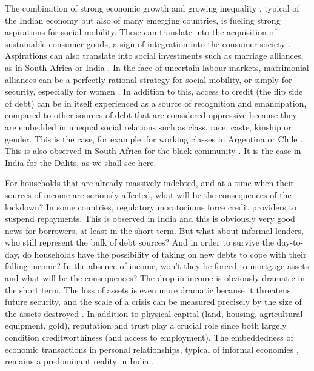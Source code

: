 \documentclass[a4paper, 11pt, onecolumn]{article}
\begin{document}
The combination of strong economic growth and growing inequality \citep{Chancel2019}, typical of the Indian economy but also of many emerging countries, is fueling strong aspirations for social mobility. These can translate into the acquisition of sustainable consumer goods, a sign of integration into the consumer society \citep{Saiag2020, Gonzalez2015}. Aspirations can also translate into social investments such as marriage alliances, as in South Africa or India \citep{James2015, Srinivasan2005}. In the face of uncertain labour markets, matrimonial alliances can be a perfectly rational strategy for social mobility, or simply for security, especially for women \citep{DeNeve2016}. In addition to this, access to credit (the flip side of debt) can be in itself experienced as a source of recognition and emancipation, compared to other sources of debt that are considered oppressive because they are embedded in unequal social relations such as class, race, caste, kinship or gender. This is the case, for example, for working classes in Argentina \citep{Saiag2020} or Chile \citep{Gonzalez2015}. 
This is also observed in South Africa for the black community \citep{James2015}. It is the case in India for the Dalits, as we shall see here.

For households that are already massively indebted, and at a time when their sources of income are seriously affected, what will be the consequences of the lockdown? In some countries, regulatory moratoriums force credit providers to suspend repayments. This is observed in India and this is obviously very good news for borrowers, at least in the short term. But what about informal lenders, who still represent the bulk of debt sources? And in order to survive the day-to-day, do households have the possibility of taking on new debts to cope with their falling income? In the absence of income, won't they be forced to mortgage assets and what will be the consequences? The drop in income is obviously dramatic in the short term. The loss of assets is even more dramatic because it threatens future security, and the scale of a crisis can be measured precisely by the size of the assets destroyed \citep{Rhyne2020}. In addition to physical capital (land, housing, agricultural equipment, gold), reputation and trust play a crucial role since both largely condition creditworthiness (and access to employment). The embeddedness of economic transactions in personal relationships, typical of informal economies \citep{Platteau1994, Hart2000}, remains a predominant reality in India \citep{Harriss-White2003}.
\end{document}
